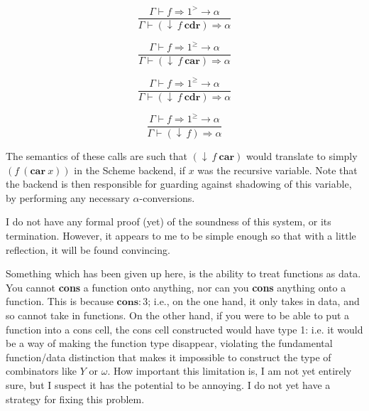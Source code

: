 \documentclass{article}
\begin{document}
\[ \frac{\Gamma\vdash f\mathbin{\Rightarrow}1^{>}\to\alpha}{\Gamma\vdash
    (\downarrow~f~\textbf{cdr})\mathbin{\Rightarrow}\alpha} \]

\[ \frac{\Gamma\vdash f\mathbin{\Rightarrow}1^{\geq}\to\alpha}{\Gamma\vdash
    (\downarrow~f~\textbf{car})\mathbin{\Rightarrow}\alpha} \]

\[ \frac{\Gamma\vdash f\mathbin{\Rightarrow}1^{\geq}\to\alpha}{\Gamma\vdash
    (\downarrow~f~\textbf{cdr})\mathbin{\Rightarrow}\alpha} \]

\[ \frac{\Gamma\vdash f\mathbin{\Rightarrow}1^{\geq}\to\alpha}{\Gamma\vdash
    (\downarrow~f)\mathbin{\Rightarrow}\alpha} \]

The semantics of these calls are such that $(\downarrow~f~\textbf{car})$ would
translate to simply $(f~(\textbf{car}~x))$ in the Scheme backend, if $x$ was the
recursive variable. Note that the backend is then responsible for guarding
against shadowing of this variable, by performing any necessary
$\alpha$-conversions.

I do not have any formal proof (yet) of the soundness of this system, or its
termination. However, it appears to me to be simple enough so that with a little
reflection, it will be found convincing.

Something which has been given up here, is the ability to treat functions as
data. You cannot \textbf{cons} a function onto anything, nor can you
\textbf{cons} anything onto a function. This is because
$\textbf{cons}\mathbin{:}3$; i.e., on the one hand, it only takes in data, and
so cannot take in functions. On the other hand, if you were to be able to put a
function into a cons cell, the cons cell constructed would have type 1: i.e. it
would be a way of making the function type disappear, violating the fundamental
function/data distinction that makes it impossible to construct the type of
combinators like $Y$ or $\omega$. How important this limitation is, I am not yet
entirely sure, but I suspect it has the potential to be annoying. I do not yet
have a strategy for fixing this problem.
\end{document}
